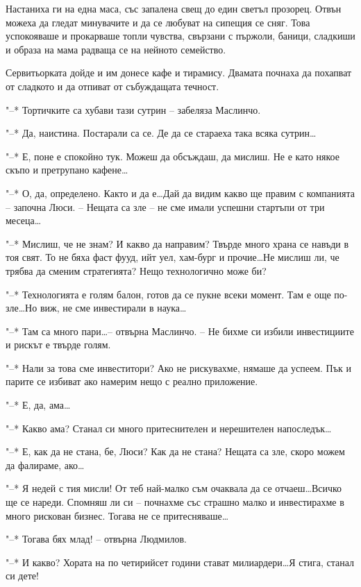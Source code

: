 \documentclass[ebook,openany,12pt]{memoir}
\begin{document}
Настаниха ги на една маса, със запалена свещ до един светъл прозорец. Отвън можеха да гледат минувачите и да се любуват на сипещия се сняг. Това успокояваше и прокарваше топли чувства, свързани с пържоли, баници, сладкиши и образа на мама радваща се на нейното семейство.

Сервитьорката дойде и им донесе кафе и тирамису. Двамата почнаха да похапват от сладкото и да отпиват от събуждащата течност.

"--* Тортичките са хубави тази сутрин – забеляза Маслинчо.

"--* Да, наистина. Постарали са се. Де да се стараеха така всяка сутрин\ldots 

"--* Е, поне е спокойно тук. Можеш да обсъждаш, да мислиш. Не е като някое скъпо и претрупано кафене\ldots

"--* О, да, определено. Както и да е\ldots Дай да видим какво ще правим с компанията – започна Люси. – Нещата са зле – не сме имали успешни стартъпи от три месеца\ldots

"--* Мислиш, че не знам? И какво да направим? Твърде много храна се навъди в тоя свят. То не бяха фаст фууд, ийт уел, хам-бург и прочие\ldots Не мислиш ли, че трябва да сменим стратегията? Нещо технологично може би?

"--* Технологията е голям балон, готов да се пукне всеки момент. Там е още по-зле\ldots Но виж, не сме инвестирали в наука\ldots

"--* Там са много пари\ldots -- отвърна Маслинчо. – Не бихме си избили инвестициите и рискът е твърде голям.

"--* Нали за това сме инвеститори? Ако не рискувахме, нямаше да успеем. Пък и парите се избиват ако намерим нещо с реално приложение. 

"--* Е, да, ама\ldots

"--* Какво ама? Станал си много притеснителен и нерешителен напоследък\ldots

"--* Е, как да не стана, бе, Люси? Как да не стана? Нещата са зле, скоро можем да фалираме, ако\ldots

"--* Я недей с тия мисли! От теб най-малко съм очаквала да се отчаеш\ldots Всичко ще се нареди. Спомняш ли си – почнахме със страшно малко и инвестирахме в много рискован бизнес. Тогава не се притесняваше\ldots

"--* Тогава бях млад! – отвърна Людмилов.

"--* И какво? Хората на по четирийсет години стават милиардери\ldots Я стига, станал си дете! 
\end{document}
